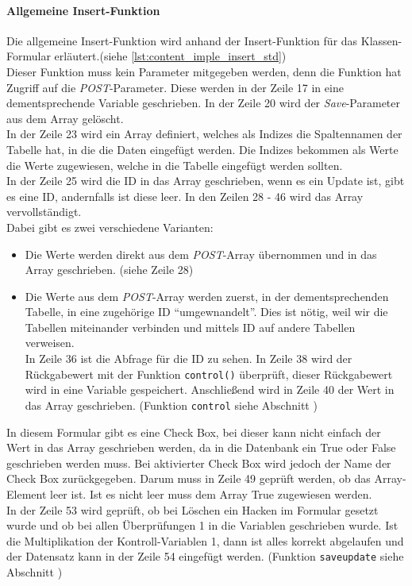 \paragraph{Allgemeine Insert-Funktion\\}
Die allgemeine Insert-Funktion wird anhand der Insert-Funktion für das Klassen-Formular erläutert.(siehe \autoref{lst:content_imple_insert_std})\\
Dieser Funktion muss kein Parameter mitgegeben werden, denn die Funktion hat Zugriff auf die \textit{POST}-Parameter. Diese werden in der Zeile 17 in eine dementsprechende Variable geschrieben. In der Zeile 20 wird der \textit{Save}-Parameter aus dem Array gelöscht.\\
In der Zeile 23 wird ein Array definiert, welches als Indizes die Spaltennamen der Tabelle hat, in die die Daten eingefügt werden. Die Indizes bekommen als Werte die Werte zugewiesen, welche in die Tabelle eingefügt werden sollten.\\
In der Zeile 25 wird die ID in das Array geschrieben, wenn es ein Update ist, gibt es eine ID, andernfalls ist diese leer. In den Zeilen 28 - 46 wird das Array vervollständigt.\\
Dabei gibt es zwei verschiedene Varianten:
\begin{itemize}
	\item Die Werte werden direkt aus dem \textit{POST}-Array übernommen und in das Array geschrieben. (siehe Zeile 28)
	\item Die Werte aus dem \textit{POST}-Array werden zuerst, in der dementsprechenden Tabelle, in eine zugehörige ID \enquote{umgewnandelt}. Dies ist nötig, weil wir die Tabellen miteinander verbinden und mittels ID auf andere Tabellen verweisen.\\
	In Zeile 36 ist die Abfrage für die ID zu sehen. In Zeile 38 wird der Rückgabewert mit der Funktion \texttt{control()} überprüft, dieser Rückgabewert wird in eine Variable gespeichert. Anschließend wird in Zeile 40 der Wert in das Array geschrieben. (Funktion \texttt{control} siehe Abschnitt )
\end{itemize}
In diesem Formular gibt es eine Check Box, bei dieser kann nicht einfach der Wert in das Array geschrieben werden, da in die Datenbank ein True oder False geschrieben werden muss. Bei aktivierter Check Box wird jedoch der Name der Check Box zurückgegeben. Darum muss in Zeile 49 geprüft werden, ob das Array-Element leer ist. Ist es nicht leer muss dem Array True zugewiesen werden.\\
In der Zeile 53 wird geprüft, ob bei Löschen ein Hacken im Formular gesetzt wurde und ob bei allen Überprüfungen 1 in die Variablen geschrieben wurde. Ist die Multiplikation der Kontroll-Variablen 1, dann ist alles korrekt abgelaufen und der Datensatz kann in der Zeile 54 eingefügt werden. (Funktion \texttt{saveupdate} siehe Abschnitt )

